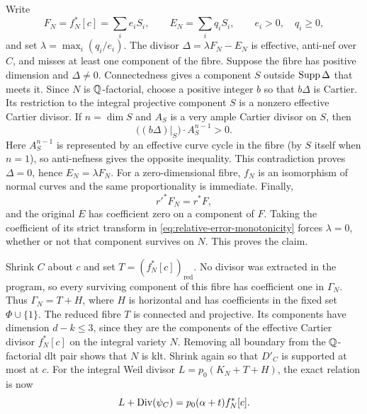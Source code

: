 Write
\[
 F_N=f_N^*[c]=\sum_i e_iS_i,\qquad E_N=\sum_i q_iS_i,
 \qquad e_i>0,\quad q_i\geq0,
\]
and set $\lambda=\max_i(q_i/e_i)$.  The divisor
$\Delta=\lambda F_N-E_N$ is effective, anti-nef over $C$, and misses at
least one component of the fibre.  Suppose the fibre has positive
dimension and $\Delta\ne0$.  Connectedness gives a component $S$ outside
$\operatorname{Supp}\Delta$ that meets it.  Since $N$ is $\mathbb Q$-factorial, choose a
positive integer $b$ so that $b\Delta$ is Cartier.  Its restriction to the
integral projective component $S$ is a nonzero effective Cartier divisor.
If $n=\dim S$ and $A_S$ is a very ample
Cartier divisor on $S$, then
\[
 \bigl((b\Delta)|_S\bigr)\cdot A_S^{n-1}>0.
\]
Here $A_S^{n-1}$ is represented by an effective curve cycle in the fibre
(by $S$ itself when $n=1$), so anti-nefness gives the opposite inequality.
This contradiction proves $\Delta=0$, hence $E_N=\lambda F_N$.
For a zero-dimensional fibre, $f_N$ is an isomorphism of normal curves
and the same proportionality is immediate.  Finally,
\[
 r'^*F_N=r^*F,
\]
and the original $E$ has coefficient zero on a component of $F$.
Taking the coefficient of its strict transform in
\eqref{eq:relative-error-monotonicity} forces $\lambda=0$, whether or not
that component survives on $N$.
This proves the claim.

Shrink $C$ about $c$ and set $T=(f_N^*[c])_{\mathrm{red}}$.  No divisor was
extracted in the program, so every surviving component of this fibre has
coefficient one in $\Gamma_N$.  Thus
$\Gamma_N=T+H$, where $H$ is horizontal and has coefficients in the fixed
set $\Phi\cup\{1\}$.  The reduced fibre $T$ is connected and projective.
Its components have dimension $d-k\leq3$, since they are the components
of the effective Cartier divisor $f_N^*[c]$ on the integral variety $N$.
Removing all boundary from the $\mathbb Q$-factorial
dlt pair shows that $N$ is klt.  Shrink again so that $D'_C$ is supported
at most at $c$.  For the integral Weil divisor
$L=p_0(K_N+T+H)$, the exact relation is now
\begin{equation}\label{eq:relative-local-cyclic}
 L+\operatorname{Div}(\psi_C)=p_0(\alpha+t)f_N^*[c].
\end{equation}
